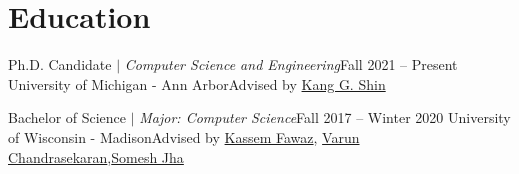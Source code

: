 \section{Education}
  \CVSubHeadingListStart
    \CVSubheading
      {{Ph.D. Candidate $|$ \emph{\small{Computer Science and Engineering}}}}{Fall 2021 -- Present}
      {University of Michigan - Ann Arbor}{Advised by \href{https://web.eecs.umich.edu/~kgshin/}{Kang G. Shin}}

    \CVSubheading
      {{Bachelor of Science $|$ \emph{\small{Major: Computer Science}}}}{Fall 2017 -- Winter 2020}
      {University of Wisconsin - Madison}{Advised by \href{https://kassemfawaz.com/}{Kassem Fawaz}, \href{https://pages.cs.wisc.edu/~chandrasekaran/}{Varun Chandrasekaran},\href{https://pages.cs.wisc.edu/~jha/}{Somesh Jha}}
  \CVSubHeadingListEnd